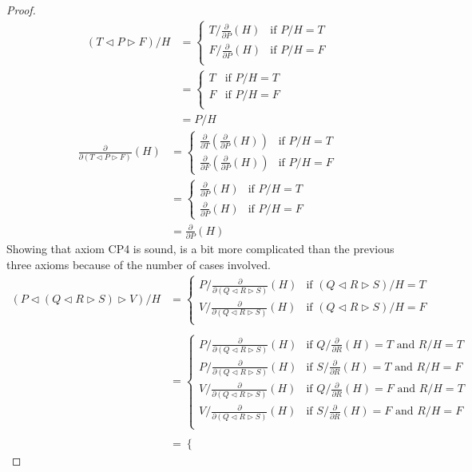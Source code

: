 \documentclass[a4paper,twoside,openright]{report}
\newcommand{\dd}[1]{\frac{\partial}{\partial #1}}
\newcommand{\lef}{\ensuremath{\triangleleft}}
\newcommand{\rig}{\ensuremath{\triangleright}}
\begin{document}
\begin{proof}
\begin{align*}
(T\lef P\rig F)/H
&=\begin{cases}
T/\dd P(H) & \text{if $P/H=T$}\\
F/\dd P(H) & \text{if $P/H=F$}\\
\end{cases}\\
&=\begin{cases}
T & \text{if $P/H=T$}\\
F & \text{if $P/H=F$}\\
\end{cases}\\
&=P/H
\end{align*}
\begin{align*}
\dd{(T\lef P\rig F)}(H)
&=\begin{cases}
\dd T(\dd P(H)) & \text{if $P/H=T$}\\
\dd F(\dd P(H)) & \text{if $P/H=F$}
\end{cases}\\
&=\begin{cases}
\dd P(H) & \text{if $P/H=T$}\\
\dd P(H) & \text{if $P/H=F$}
\end{cases}\\
&=\dd P(H)
\end{align*}
Showing that axiom CP4 is sound, is a bit more complicated than the previous three axioms because of the number of cases involved.
\begin{align*}
(P\lef(Q\lef R\rig S)\rig V)/H 
&=\begin{cases}
P/\dd{(Q\lef R\rig S)}(H) & \text{if $(Q\lef R\rig S)/H=T$}\\
V/\dd{(Q\lef R\rig S)}(H) & \text{if $(Q\lef R\rig S)/H=F$}\\
\end{cases}\\\\
&=\begin{cases}
P/\dd{(Q\lef R\rig S)}(H) & \text{if $Q/\dd R(H)=T$ and $R/H=T$}\\
P/\dd{(Q\lef R\rig S)}(H) & \text{if $S/\dd R(H)=T$ and $R/H=F$}\\
V/\dd{(Q\lef R\rig S)}(H) & \text{if $Q/\dd R(H)=F$ and $R/H=T$}\\
V/\dd{(Q\lef R\rig S)}(H) & \text{if $S/\dd R(H)=F$ and $R/H=F$}\\
\end{cases}\\\\
&=\begin{cases}

\end{cases}
\end{align*}
\end{proof}
\end{document}
